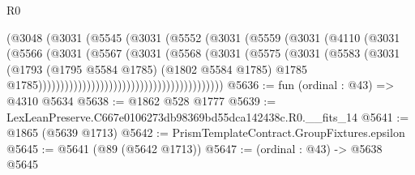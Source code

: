 \begin{lexlean}{R0}
\begin{coremodule}
                                              (@3048
                                                (@3031
                                                  (@5545
                                                    (@3031
                                                      (@5552
                                                        (@3031
                                                          (@5559
                                                            (@3031
                                                              (@4110
                                                                (@3031
                                                                  (@5566
                                                                    (@3031
                                                                      (@5567
                                                                        (@3031
                                                                          (@5568
                                                                            (@3031
                                                                              (@5575
                                                                                (@3031
                                                                                  (@5583
                                                                                    (@3031
                                                                                      (@1793
                                                                                        (@1795
                                                                                          @5584
                                                                                          @1785)
                                                                                        (@1802
                                                                                          @5584
                                                                                          @1785)
                                                                                        @1785
                                                                                        @1785))))))))))))))))))))))))))))))))))))))))))
@5636 := fun (ordinal : @43) => @4310 @5634
@5638 := @1862 @528 @1777
@5639 := LexLeanPreserve.C667e0106273db98369bd55dca142438c.R0.__fits_14
@5641 := @1865 (@5639 @1713)
@5642 := PrismTemplateContract.GroupFixtures.epsilon
@5645 := @5641 (@89 (@5642 @1713))
@5647 := (ordinal : @43) -> @5638 @5645

\end{coremodule}
\end{lexlean}
